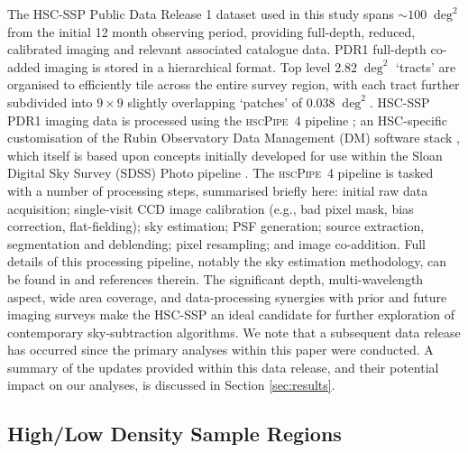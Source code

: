 \documentclass[fleqn,usenatbib,useAMS]{mnras}
\newcommand*{\about}{\mathord\sim}
\newcommand*{\RO}{Rubin Observatory\xspace}
\begin{document}
The HSC-SSP Public Data Release 1 \citep[PDR1\footnote{\url{https://hsc-release.mtk.nao.ac.jp}},][]{Aihara2018b} dataset used in this study spans $\about100\;\deg^2$ from the initial 12 month observing period, providing full-depth, reduced, calibrated imaging and relevant associated catalogue data. PDR1 full-depth co-added imaging is stored in a hierarchical format. Top level $2.82\;\deg^2$ `tracts' are organised to efficiently tile across the entire survey region, with each tract further subdivided into $9\times9$ slightly overlapping `patches' of $0.038\;\deg^2$. HSC-SSP PDR1 imaging data is processed using the \textsc{hscPipe~4} pipeline \citep{Bosch2018,Huang2018}; an HSC-specific customisation of the \RO \citep[formerly Large Synoptic Survey Telescope,][]{Ivezic2008} Data Management (DM) software stack \citep{Juric2017}, which itself is based upon concepts initially developed for use within the Sloan Digital Sky Survey (SDSS) Photo pipeline \citep{Lupton2001}. The \textsc{hscPipe~4} pipeline is tasked with a number of processing steps, summarised briefly here: initial raw data acquisition; single-visit CCD image calibration (e.g., bad pixel mask, bias correction, flat-fielding); sky estimation; PSF generation; source extraction, segmentation and deblending; pixel resampling; and image co-addition. Full details of this processing pipeline, notably the sky estimation methodology, can be found in \citet{Bosch2018} and references therein. The significant depth, multi-wavelength aspect, wide area coverage, and data-processing synergies with prior and future imaging surveys make the HSC-SSP an ideal candidate for further exploration of contemporary sky-subtraction algorithms. We note that a subsequent data release has occurred since the primary analyses within this paper were conducted. A summary of the updates provided within this data release, and their potential impact on our analyses, is discussed in Section \ref{sec:results}. 

\subsection{High/Low Density Sample Regions}
\label{sec:sample}
\end{document}
